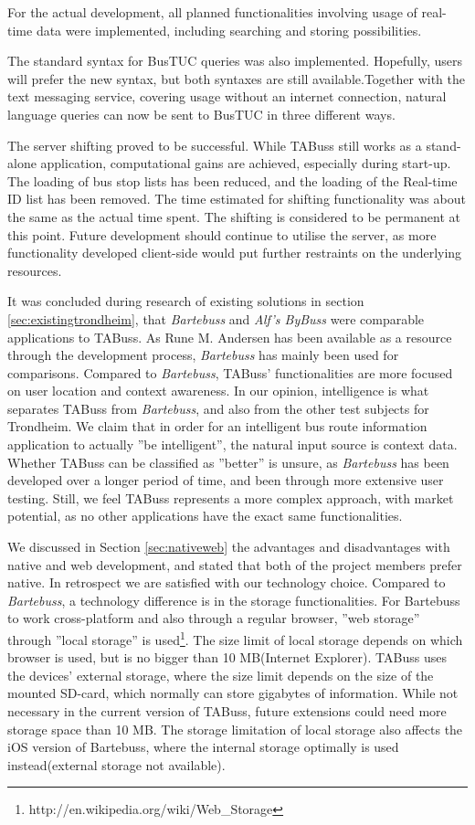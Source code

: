 For the actual development, all planned functionalities involving usage of real-time data were implemented, including searching and storing possibilities.

The standard syntax for BusTUC queries was also implemented. Hopefully, users will prefer the new syntax, but both syntaxes are still available.Together with the text messaging service, covering usage without an internet connection, natural language queries can now be sent to BusTUC in three different ways.

The server shifting proved to be successful. While TABuss still works as a stand-alone application, computational gains are achieved, especially during start-up. The loading of bus stop lists has been reduced, and the loading of the Real-time ID list has been removed. The time estimated for shifting functionality was about the same as the actual time spent. The shifting is considered to be permanent at this point. Future development should continue to utilise the server, as more functionality developed client-side would put further restraints on the underlying resources.

It was concluded during research of existing solutions in section \ref{sec:existingtrondheim}, that \emph{Bartebuss} and \emph{Alf's ByBuss} were comparable applications to TABuss. As Rune M. Andersen has been available as a resource through the development process, \emph{Bartebuss} has mainly been used for comparisons. Compared to \emph{Bartebuss}, TABuss' functionalities are more focused on user location and context awareness. In our opinion, intelligence is what separates TABuss from \emph{Bartebuss}, and also from the other test subjects for Trondheim. We claim that in order for an intelligent bus route information application to actually ''be intelligent'', the natural input source is context data. Whether TABuss can be classified as ''better'' is unsure, as \emph{Bartebuss} has been developed over a longer period of time, and been through more extensive user testing. Still, we feel TABuss represents a more complex approach, with market potential, as no other applications have the exact same functionalities. 

We discussed in Section \ref{sec:nativeweb} the advantages and disadvantages with native and web development, and stated that both of the project members prefer native. In retrospect we are satisfied with our technology choice. Compared to \emph{Bartebuss}, a technology difference is in the storage functionalities. For Bartebuss to work cross-platform and also through a regular browser, ''web storage'' through ''local storage'' is used\footnote{http://en.wikipedia.org/wiki/Web\_Storage}. The size limit of local storage depends on which browser is used, but is no bigger than 10 MB(Internet Explorer). TABuss uses the devices' external storage, where the size limit depends on the size of the mounted SD-card, which normally can store gigabytes of information. While not necessary in the current version of TABuss, future extensions could need more storage space than 10 MB. The storage limitation of local storage also affects the iOS version of Bartebuss, where the internal storage optimally is used instead(external storage not available).

